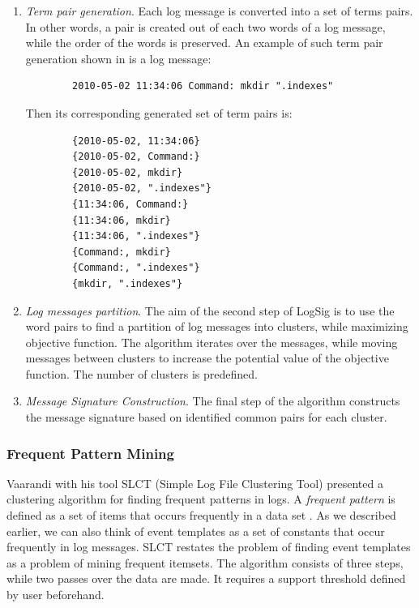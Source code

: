     \begin{enumerate}
        \item \textit{Term pair generation}. Each log message is converted into a set of terms pairs. In other words, a pair is created out of each two words of a log message, while the order of the words is preserved. An example of such term pair generation shown in \cite{logsig2011} is a log message: 
        
        \begin{verbatim}
        2010-05-02 11:34:06 Command: mkdir ".indexes"
        \end{verbatim}
        
        Then its corresponding generated set of term pairs is: \\
        \begin{verbatim}
        {2010-05-02, 11:34:06}
        {2010-05-02, Command:}
        {2010-05-02, mkdir}
        {2010-05-02, ".indexes"}
        {11:34:06, Command:}
        {11:34:06, mkdir}
        {11:34:06, ".indexes"}
        {Command:, mkdir}
        {Command:, ".indexes"}
        {mkdir, ".indexes"}
        \end{verbatim}

        \item \textit{Log messages partition}. The aim of the second step of LogSig is to use the word pairs to find a partition of log messages into clusters, while maximizing objective function. The algorithm iterates over the messages, while moving messages between clusters to increase the potential value of the objective function. The number of clusters is predefined. 
        
        \item \textit{Message Signature Construction}. The final step of the algorithm constructs the message signature based on identified common pairs for each cluster.
    \end{enumerate}
    
    \subsubsection*{Frequent Pattern Mining} 
    Vaarandi with his tool SLCT (Simple Log File Clustering Tool) \cite{vaarandi2003} presented a clustering algorithm for finding frequent patterns in logs. A \textit{frequent pattern} is defined as a set of items that occurs frequently in a data set \cite{zhlhxzl2018}. As we described earlier, we can also think of event templates as a set of constants that occur frequently in log messages. SLCT restates the problem of finding event templates as a problem of mining frequent itemsets. The algorithm consists of three steps, while two passes over the data are made. It requires a support threshold defined by user beforehand.
   
